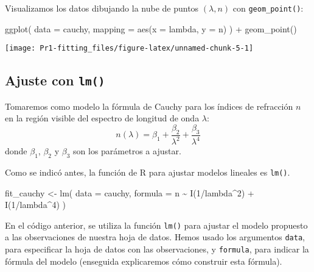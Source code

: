 \documentclass[
  degree=mecinf,
  title=normal,
  toc=normal,
  bib=normal]{mnye}
\newenvironment{Shaded}{\begin{snugshade}}{\end{snugshade}}
\newcommand{\AttributeTok}[1]{\textcolor[rgb]{0.77,0.63,0.00}{#1}}
\newcommand{\DecValTok}[1]{\textcolor[rgb]{0.00,0.00,0.81}{#1}}
\newcommand{\FunctionTok}[1]{\textcolor[rgb]{0.00,0.00,0.00}{#1}}
\newcommand{\NormalTok}[1]{#1}
\newcommand{\OtherTok}[1]{\textcolor[rgb]{0.56,0.35,0.01}{#1}}
\newcommand{\SpecialCharTok}[1]{\textcolor[rgb]{0.00,0.00,0.00}{#1}}
\begin{document}
Visualizamos los datos dibujando la nube de puntos \((\lambda, n)\) con \texttt{geom\_point()}:

\begin{Shaded}
\begin{Highlighting}[]
\FunctionTok{ggplot}\NormalTok{(}
    \AttributeTok{data =}\NormalTok{ cauchy,}
    \AttributeTok{mapping =} \FunctionTok{aes}\NormalTok{(}\AttributeTok{x =}\NormalTok{ lambda, }\AttributeTok{y =}\NormalTok{ n)}
\NormalTok{) }\SpecialCharTok{+} 
    \FunctionTok{geom\_point}\NormalTok{()}
\end{Highlighting}
\end{Shaded}

\begin{center}\texttt{[image: Pr1-fitting\_files/figure-latex/unnamed-chunk-5-1]} \end{center}

\hypertarget{ajuste-con-lm}{%
\subsection{\texorpdfstring{Ajuste con \texttt{lm()}}{Ajuste con lm()}}\label{ajuste-con-lm}}

Tomaremos como modelo la fórmula de Cauchy para los índices de refracción \(n\) en la región visible del espectro de longitud de onda \(\lambda\):
\[n(\lambda) = \beta_1 + \frac{\beta_2}{\lambda^2} + \frac{\beta_3}{\lambda^4}\]
donde \(\beta_1\), \(\beta_2\) y \(\beta_3\) son los parámetros a ajustar.

Como se indicó antes, la función de \textsf{R} para ajustar modelos lineales es \texttt{lm()}.

\begin{Shaded}
\begin{Highlighting}[]
\NormalTok{fit\_cauchy }\OtherTok{\textless{}{-}} \FunctionTok{lm}\NormalTok{(}
        \AttributeTok{data =}\NormalTok{ cauchy, }
        \AttributeTok{formula =}\NormalTok{ n }\SpecialCharTok{\textasciitilde{}} \FunctionTok{I}\NormalTok{(}\DecValTok{1}\SpecialCharTok{/}\NormalTok{lambda}\SpecialCharTok{\^{}}\DecValTok{2}\NormalTok{) }\SpecialCharTok{+} \FunctionTok{I}\NormalTok{(}\DecValTok{1}\SpecialCharTok{/}\NormalTok{lambda}\SpecialCharTok{\^{}}\DecValTok{4}\NormalTok{)}
\NormalTok{    )}
\end{Highlighting}
\end{Shaded}

En el código anterior, se utiliza la función \texttt{lm()} para ajustar el modelo propuesto a las observaciones de nuestra hoja de datos.
Hemos usado los argumentos \texttt{data}, para especificar la hoja de datos con las observaciones, y \texttt{formula}, para indicar la fórmula del modelo (enseguida explicaremos cómo construir esta fórmula).
\end{document}
